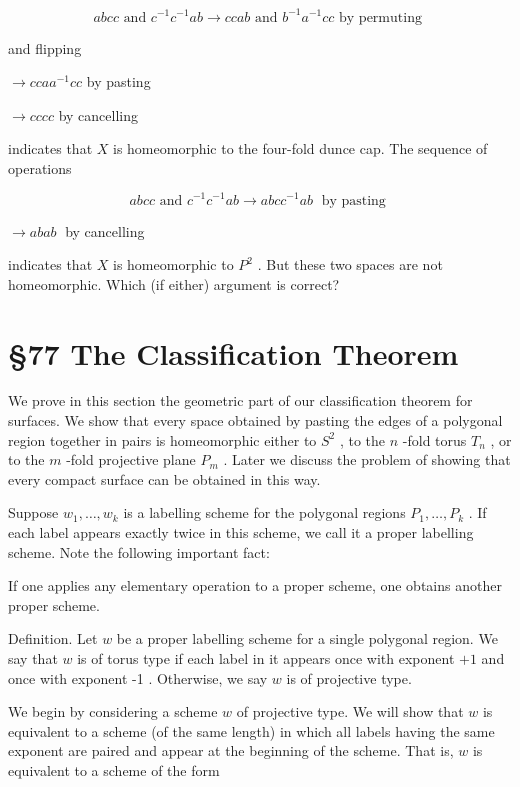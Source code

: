 \documentclass[10pt]{article}
\begin{document}
\[
{abcc}\text{ and }{c}^{-1}{c}^{-1}{ab} \rightarrow  {ccab}\text{ and }{b}^{-1}{a}^{-1}{cc}\text{ by permuting }
\]

and flipping

\(\rightarrow  {cca}{a}^{-1}{cc}\) by pasting

\(\rightarrow  {cccc}\) by cancelling

indicates that \(X\) is homeomorphic to the four-fold dunce cap. The sequence of operations

\[
{abcc}\text{ and }{c}^{-1}{c}^{-1}{ab} \rightarrow  {abc}{c}^{-1}{ab}\;\text{ by pasting }
\]

\(\rightarrow  {abab}\;\) by cancelling

indicates that \(X\) is homeomorphic to \({P}^{2}\) . But these two spaces are not homeomorphic. Which (if either) argument is correct?

\section*{§77 The Classification Theorem}

We prove in this section the geometric part of our classification theorem for surfaces. We show that every space obtained by pasting the edges of a polygonal region together in pairs is homeomorphic either to \({S}^{2}\) , to the \(n\) -fold torus \({T}_{n}\) , or to the \(m\) -fold projective plane \({P}_{m}\) . Later we discuss the problem of showing that every compact surface can be obtained in this way.

Suppose \({w}_{1},\ldots ,{w}_{k}\) is a labelling scheme for the polygonal regions \({P}_{1},\ldots ,{P}_{k}\) . If each label appears exactly twice in this scheme, we call it a proper labelling scheme. Note the following important fact:

If one applies any elementary operation to a proper scheme, one obtains another proper scheme.

Definition. Let \(w\) be a proper labelling scheme for a single polygonal region. We say that \(w\) is of torus type if each label in it appears once with exponent \(+ 1\) and once with exponent -1 . Otherwise, we say \(w\) is of projective type.

We begin by considering a scheme \(w\) of projective type. We will show that \(w\) is equivalent to a scheme (of the same length) in which all labels having the same exponent are paired and appear at the beginning of the scheme. That is, \(w\) is equivalent to a scheme of the form
\end{document}
